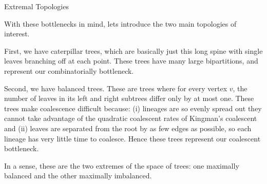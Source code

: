 \documentclass[11pt,aspectratio=169]{beamer}
\begin{document}
\begin{frame}{Extremal Topologies}
{  With these bottlenecks in mind, lets introduce the two main topologies of interest.\\

  \vspace{0.5em}

  First, we have caterpillar trees, which are basically just this long spine with single leaves branching off at each point. These trees have
  many large bipartitions, and represent our combinatorially bottleneck. 

  \vspace{0.5em}

  Second, we have balanced trees. These are trees where for every vertex $v$, the 
  number of leaves in its left and right subtrees differ only by at most one. These trees make coalescence difficult because: (i) lineages
  are so evenly spread out they cannot take advantage of the quadratic coalescent rates of Kingman's coalescent and (ii) leaves are separated from
  the root by as few edges as possible, so each lineage has very little time to coalesce. Hence these trees represent our coalescent bottleneck. \\

  \vspace{0.5em}

  \noindent In a sense, these are the two extremes of the space of trees: one maximally balanced and the other maximally imbalanced.
}
\end{frame}
\end{document}
